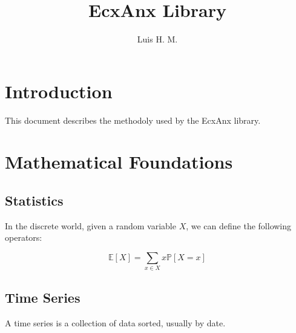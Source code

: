 \documentclass[•]{article}
\title{EcxAnx Library}
\author{Luis H. M.}
\date{}
\begin{document}
\maketitle


\section{Introduction}

This document describes the methodoly used by the EcxAnx library.

\section {Mathematical Foundations}

\subsection{Statistics}

In the discrete world, given a random variable $X$, we can define the following operators:

\begin{equation}
\mathbb{E}[X] = \sum_{x \in X} x \mathbb{P}[X = x]
\end{equation}


\subsection{Time Series}
A time series is a collection of data sorted, usually by date.
\end{document}
